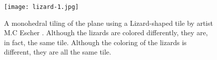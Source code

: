 
\begin{figure}[t]%
    \centering
    \texttt{[image: lizard-1.jpg]}
    \caption{A monohedral tiling of the plane using a Lizard-shaped tile by artist M.C Escher \cite{m.c.escherLizard1942}. Although the lizards are colored differently, they are, in fact, the same tile. Although the coloring of the lizards is different, they are all the same tile.}
    \label{fig:tiling_three}
\end{figure}


